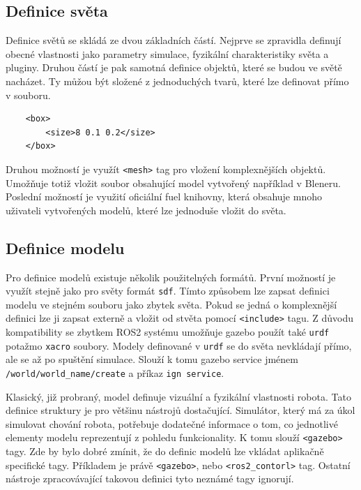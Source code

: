 \subsection*{Definice světa}
Definice světů se skládá ze dvou základních částí. Nejprve se zpravidla definují obecné vlastnosti jako parametry simulace, fyzikální charakteristiky světa a pluginy. Druhou částí je pak samotná definice objektů, které se budou ve světě nacházet. Ty můžou být složené z jednoduchých tvarů, které lze definovat přímo v souboru.
\begin{verbatim}
	<box>
		<size>8 0.1 0.2</size>
	</box>
\end{verbatim}
 Druhou možností je využít \verb|<mesh>| tag pro vložení komplexnějších objektů. Umožňuje totiž vložit soubor obsahující model vytvořený například v Bleneru. Poslední možností je využití oficiální fuel knihovny, která obsahuje mnoho uživateli vytvořených modelů, které lze jednoduše vložit do světa.

\subsection*{Definice modelu}
Pro definice modelů existuje několik použitelných formátů. První možností je využít stejně jako pro světy formát \verb|sdf|. Tímto způsobem lze zapsat definici modelu ve stejném souboru jako zbytek světa. Pokud se jedná o komplexnější definici lze ji zapsat externě a vložit od stvěta pomocí \verb|<include>| tagu. Z důvodu kompatibility se zbytkem ROS2 systému umožňuje gazebo použít také \verb|urdf| potažmo \verb|xacro| soubory. Modely definované v \verb|urdf| se do světa nevkládají přímo, ale  se až po spuštění simulace. Slouží k tomu gazebo service jménem \verb|/world/world_name/create| a příkaz \verb|ign service|.

Klasický, již probraný, model definuje vizuální a fyzikální vlastnosti robota. Tato definice struktury je pro většinu nástrojů dostačující. Simulátor, který má za úkol simulovat chování robota, potřebuje dodatečné informace o tom, co jednotlivé elementy modelu reprezentují z pohledu funkcionality. K tomu slouží \verb|<gazebo>| tagy. Zde by bylo dobré zmínit, že do definic modelů lze vkládat aplikačně specifické tagy. Příkladem je právě \verb|<gazebo>|, nebo \verb|<ros2_contorl>| tag. Ostatní nástroje zpracovávající takovou definici tyto neznámé tagy ignorují.


